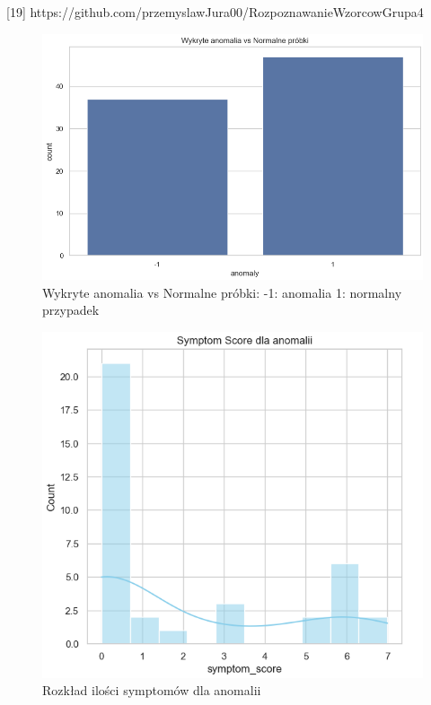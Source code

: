 \documentclass[a4paper,fleqn]{cas-dc}
\begin{document}
[19] https://github.com/przemyslawJura00/RozpoznawanieWzorcowGrupa4




\newpage
\newpage
\begin{figure}[h]
	\includegraphics[scale=.40]{wykresy/wykres1.png}
	\caption{Wykryte anomalia vs Normalne próbki: -1: anomalia 1: normalny przypadek}
	\label{FIG:1}
\end{figure}

\begin{figure}[h]
	\includegraphics[scale=.73]{wykresy/wykres2.1.png}
	\caption{Rozkład ilości symptomów dla anomalii}
	\label{FIG:1}
\end{figure}
\end{document}
